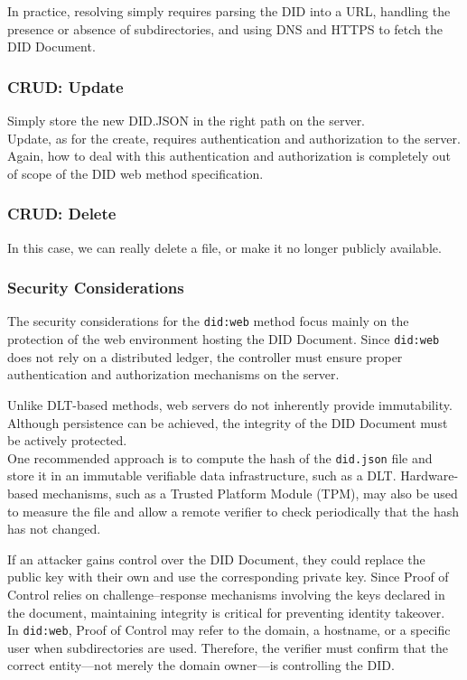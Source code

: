 \noindent
In practice, resolving simply requires parsing the DID into a URL, handling the presence or absence of subdirectories, and using DNS and HTTPS to fetch the DID Document.

\subsubsection*{CRUD: Update}
Simply store the new DID.JSON in the right path on the server. \\
Update, as for the create, requires authentication and authorization to the server.\\
Again, how to deal with this authentication and authorization is completely out of scope of the DID web method specification.

\subsubsection*{CRUD: Delete}
In this case, we can really delete a file, or make it no longer publicly available.

\subsubsection*{Security Considerations}

The security considerations for the \texttt{did:web} method focus mainly on the protection of the web environment hosting the DID Document. Since \texttt{did:web} does not rely on a distributed ledger, the controller must ensure proper authentication and authorization mechanisms on the server.
\medskip

\noindent
Unlike DLT-based methods, web servers do not inherently provide immutability. Although persistence can be achieved, the integrity of the DID Document must be actively protected. \\
One recommended approach is to compute the hash of the \texttt{did.json} file and store it in an immutable verifiable data infrastructure, such as a DLT. Hardware-based mechanisms, such as a Trusted Platform Module (TPM), may also be used to measure the file and allow a remote verifier to check periodically that the hash has not changed.
\medskip

\noindent
If an attacker gains control over the DID Document, they could replace the public key with their own and use the corresponding private key. Since Proof of Control relies on challenge--response mechanisms 
involving the keys declared in the document, maintaining integrity is critical for preventing identity takeover. \\
In \texttt{did:web}, Proof of Control may refer to the domain, a hostname, or a specific user when subdirectories are used. Therefore, the verifier must confirm that the correct entity---not merely the domain owner---is controlling the DID.
\medskip

